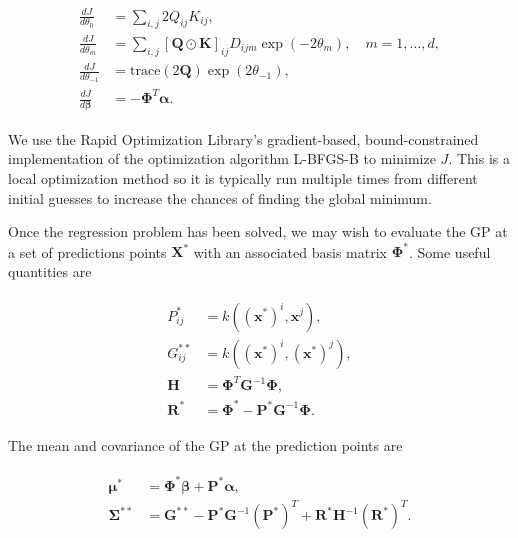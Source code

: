 \begin{gather}
\begin{aligned}
\frac{dJ}{d\theta_0} &= \sum_{i,j}  2 Q_{ij} K_{ij}, \\
\frac{dJ}{d\theta_m} &= \sum_{i,j} \left[   \boldsymbol{Q} \odot \boldsymbol{K}  \right]_{ij}   D_{ijm} \exp(-2 \theta_m), \quad m = 1, \ldots, d, \\
\frac{dJ}{d\theta_{-1}} &= \text{trace}(2 \boldsymbol{Q}) \exp(2\theta_{-1}), \\
\frac{dJ}{d \boldsymbol{\beta}} &= - \boldsymbol{\Phi}^T \boldsymbol{\alpha}.
\end{aligned}
\end{gather}

We use the Rapid Optimization Library's \cite{Kou2014}  gradient-based, bound-constrained 
implementation of the optimization algorithm L-BFGS-B \cite{Byrd95} to minimize $J$. This 
is a local optimization method so it is typically run multiple times from 
different initial guesses to increase the chances of finding the global 
minimum.

Once the regression problem has been solved, we may wish to evaluate the GP
at a set of predictions points $\boldsymbol{X}^*$ with an associated basis
matrix $\boldsymbol{\Phi}^*$.  Some useful quantities are 

\begin{gather}
\begin{aligned}
P^*_{ij} &=  k\left(\left(\boldsymbol{x}^*\right)^i,\boldsymbol{x}^j\right), \\
G^{**}_{ij} &=  k\left(\left(\boldsymbol{x}^*\right)^i,\left(\boldsymbol{x}^*\right)^j\right), \\
\boldsymbol{H} &= \boldsymbol{\Phi}^T  \boldsymbol{G}^{-1}  \boldsymbol{\Phi}, \\
\boldsymbol{R}^{*} &= \boldsymbol{\Phi}^* - \boldsymbol{P}^{*} \boldsymbol{G}^{-1}  \boldsymbol{\Phi}.
\end{aligned}
\end{gather}

\noindent The mean and covariance of the GP at the prediction points are

\begin{gather}
\begin{aligned}
\boldsymbol{\mu}^{*} &= \boldsymbol{\Phi}^* \boldsymbol{\beta} + \boldsymbol{P}^{*} \boldsymbol{\alpha}, \\
\boldsymbol{\Sigma}^{**} &= \boldsymbol{G}^{**} - \boldsymbol{P}^{*}  \boldsymbol{G}^{-1}  \left(\boldsymbol{P}^{*}\right)^T + \boldsymbol{R}^{*} \boldsymbol{H}^{-1} \left(\boldsymbol{R}^{*}\right)^T.
\end{aligned}
\end{gather}

